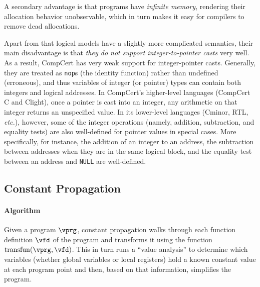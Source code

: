 A secondary advantage is that programs have \emph{infinite memory}, rendering
their allocation behavior unobservable, which in turn makes it easy for
compilers to remove dead allocations.


Apart from that logical models have a slightly more complicated
semantics, their main disadvantage is that \emph{they do not support
  integer-to-pointer casts} very well.
As a result,
CompCert has very weak support for integer-pointer casts.  Generally,
they are treated as \texttt{nop}s (\ie the identity function) rather
than undefined (\ie erroneous), and thus variables of integer (or
pointer) types can contain both integers and logical addresses.  In
CompCert's higher-level languages (CompCert C and Clight), once a
pointer is cast into an integer, any arithmetic on that integer
returns an unspecified value.  In its lower-level languages (Cminor,
RTL, \emph{etc.}), however, some of the integer operations (namely,
addition, subtraction, and equality tests) are also well-defined for
pointer values in special cases.  More specifically, for instance,
the addition of an integer to an address, the
subtraction between addresses when they are in the same logical block,
and the equality test between an address and \texttt{NULL} are well-defined.



\subsection{Constant Propagation}
\label{sec:background:constprop}

\paragraph{Algorithm}

Given a program $\vprg$, constant propagation walks through each function definition $\vfd$ of the program 
and transforms it using the function $\mathrm{transfun}(\vprg, \vfd)$.
This in turn runs a ``value analysis'' to determine which variables (whether global variables or local registers) hold a known constant value at each program point
and then, based on that information, simplifies the program.

